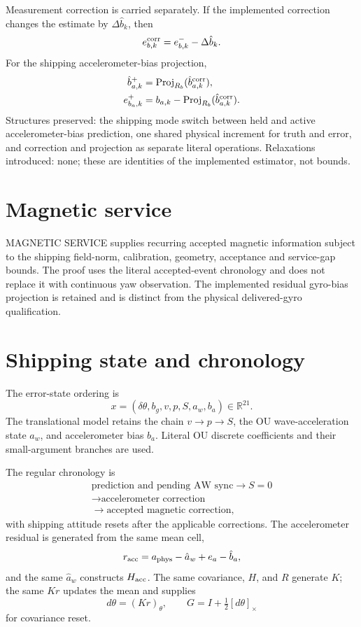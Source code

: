 \documentclass[journal]{IEEEtran}
\newcommand{\R}{\mathbb{R}}\newcommand{\norm}[1]{\left\lVert#1\right\rVert}
\begin{document}
Measurement correction is carried separately. If the implemented correction
changes the estimate by $\Delta\hat b_k$, then
\begin{equation}
 e_{b,k}^{\rm corr}=e_{b,k}^{-}-\Delta\hat b_k .
 \label{eq:bias-correction}
\end{equation}
For the shipping accelerometer-bias projection,
\begin{align}
 \hat b_{a,k}^{+}&=\operatorname{Proj}_{R_b}
                      (\hat b_{a,k}^{\rm corr}),\nonumber\\
 e_{b_a,k}^{+}&=b_{a,k}-
 \operatorname{Proj}_{R_b}(\hat b_{a,k}^{\rm corr}).
 \label{eq:bias-projection}
\end{align}
Structures preserved: the shipping mode switch between held and active
accelerometer-bias prediction, one shared physical increment for truth and
error, and correction and projection as separate literal operations.
Relaxations introduced: none; these are identities of the implemented
estimator, not bounds.

\section{Magnetic service}
MAGNETIC SERVICE supplies recurring accepted magnetic information subject to the shipping field-norm, calibration, geometry, acceptance and service-gap bounds. The proof uses the literal accepted-event chronology and does not replace it with continuous yaw observation. The implemented residual gyro-bias projection is retained and is distinct from the physical delivered-gyro qualification.

\section{Shipping state and chronology}
The error-state ordering is
\[
x=(\delta\theta,b_g,v,p,S,a_w,b_a)\in\R^{21}.
\]
The translational model retains the chain \(v\to p\to S\), the OU wave-acceleration state \(a_w\), and accelerometer bias \(b_a\). Literal OU discrete coefficients and their small-argument branches are used.

The regular chronology is
\[
\begin{gathered}
\text{prediction and pending AW sync}\to S=0\\
\to\text{accelerometer correction}\\
\to\text{accepted magnetic correction},
\end{gathered}
\]
with shipping attitude resets after the applicable corrections. The accelerometer residual is generated from the same mean cell,
\[
r_{\rm acc}=a_{\rm phys}-\hat a_w+e_a-\hat b_a,
\]
and the same \(\hat a_w\) constructs \(H_{\rm acc}\). The same covariance, \(H\), and \(R\) generate \(K\); the same \(Kr\) updates the mean and supplies
\[
d\theta=(Kr)_\theta,\qquad G=I+\tfrac12[d\theta]_\times
\]
for covariance reset.
\end{document}
